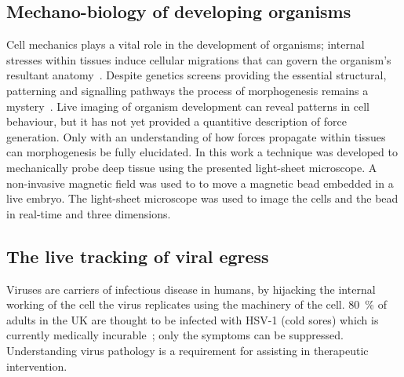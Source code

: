 \subsection{Mechano-biology of developing organisms}

Cell mechanics plays a vital role in the development of organisms;
internal stresses within tissues induce cellular migrations that can govern the organism's resultant anatomy~\cite{gilbertDevelopmentalBiology2000}.
Despite genetics screens providing the essential structural, patterning and signalling pathways the process of morphogenesis remains a mystery~\cite{mammotoMechanicalControlTissue2010,mammotoMechanobiologyDevelopmentalControl2013}.
Live imaging of organism development can reveal patterns in cell behaviour, but it has not yet provided a quantitive description of force generation.
Only with an understanding of how forces propagate within tissues can morphogenesis be fully elucidated.
%
In this work a technique was developed to mechanically probe deep tissue using the presented light-sheet microscope.
A non-invasive magnetic field was used to to move a magnetic bead embedded in a live embryo.
The light-sheet microscope was used to image the cells and the bead in real-time and three dimensions.

\subsection{The live tracking of viral egress}

Viruses are carriers of infectious disease in humans, by hijacking the internal working of the cell the virus replicates using the machinery of the cell.
\SI{80}{\percent} of adults in the UK are thought to be infected with \gls{HSV}-1 (cold sores) which is currently medically incurable~\cite{_herpes_????}; only the symptoms can be suppressed.
Understanding virus pathology is a requirement for assisting in therapeutic intervention.

